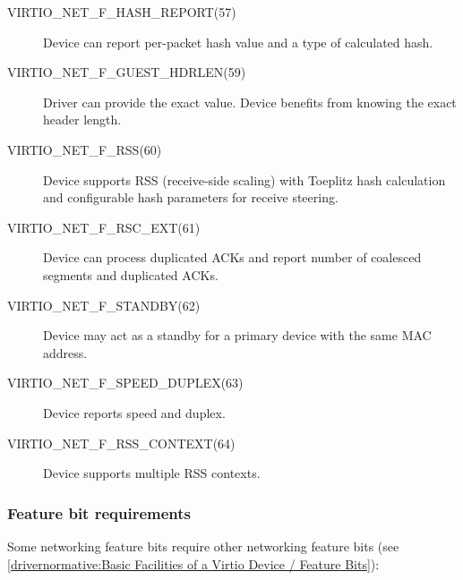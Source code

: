 \begin{description}
\item[VIRTIO_NET_F_HASH_REPORT(57)] Device can report per-packet hash
    value and a type of calculated hash.

\item[VIRTIO_NET_F_GUEST_HDRLEN(59)] Driver can provide the exact 
    value. Device benefits from knowing the exact header length.

\item[VIRTIO_NET_F_RSS(60)] Device supports RSS (receive-side scaling)
    with Toeplitz hash calculation and configurable hash
    parameters for receive steering.

\item[VIRTIO_NET_F_RSC_EXT(61)] Device can process duplicated ACKs
    and report number of coalesced segments and duplicated ACKs.

\item[VIRTIO_NET_F_STANDBY(62)] Device may act as a standby for a primary
    device with the same MAC address.

\item[VIRTIO_NET_F_SPEED_DUPLEX(63)] Device reports speed and duplex.

\item[VIRTIO_NET_F_RSS_CONTEXT(64)] Device supports multiple RSS contexts.
\end{description}

\subsubsection{Feature bit requirements}\label{sec:Device Types / Network Device / Feature bits / Feature bit requirements}

Some networking feature bits require other networking feature bits
(see \ref{drivernormative:Basic Facilities of a Virtio Device / Feature Bits}):

